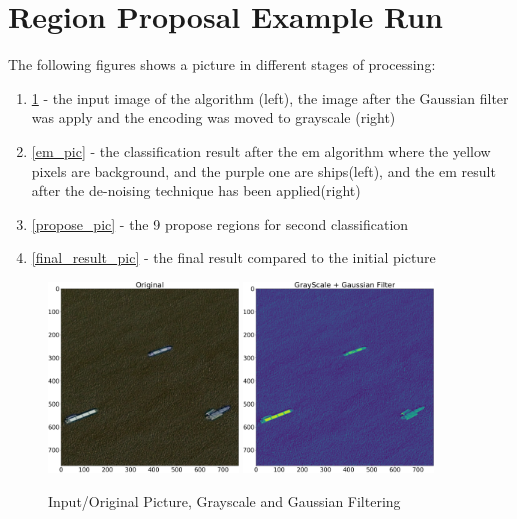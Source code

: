 \section{Region Proposal Example Run}
The following figures shows a picture in different stages of processing:
\begin{enumerate}
	\item \ref{orig_pic} - the input image of the algorithm (left), the image after the Gaussian filter was apply and the encoding was moved to grayscale (right)
	\item \ref{em_pic} - the classification result after the em algorithm where the yellow pixels are background, and the purple one are ships(left), and the em result after the de-noising technique has been applied(right)
	\item \ref{propose_pic} - the 9 propose regions for second classification
	\item \ref{final_result_pic} - the final result compared to the initial picture
\end{enumerate}

\begin{figure}[H]
	\centering
	\includegraphics[width=0.45\textwidth]{Pictures/011Original.png}
	\includegraphics[width=0.45\textwidth]{Pictures/011GrayScale.png}
	\caption{Input/Original Picture, Grayscale and Gaussian Filtering}
	\label{orig_pic}
\end{figure}

